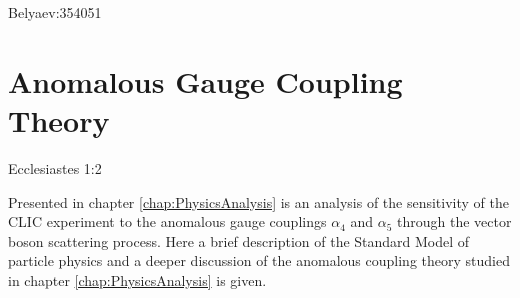 Belyaev:354051\chapter{Anomalous Gauge Coupling Theory}
\label{chap:anomalousgaugecouplingtheory}

{Ecclesiastes 1:2}

Presented in chapter \ref{chap:PhysicsAnalysis} is an analysis of the sensitivity of the CLIC experiment to the anomalous gauge couplings $\alpha_{4}$ and $\alpha_{5}$ through the vector boson scattering process.  Here a brief description of the Standard Model of particle physics and a deeper discussion of the anomalous coupling theory studied in chapter \ref{chap:PhysicsAnalysis} is given.  

%
